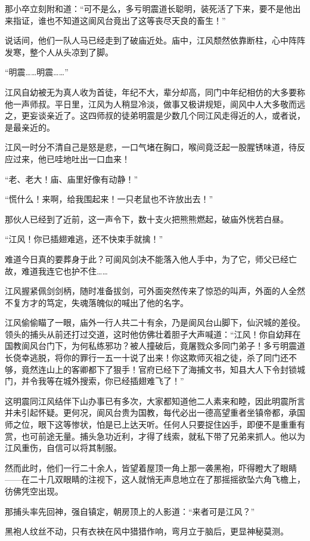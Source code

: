 那小卒立刻附和道：“可不是么，多亏明震道长聪明，装死活了下来，要不是他出来指证，谁也不知道这阆风台竟出了这等丧尽天良的畜生！”

说话间，他们一队人马已经走到了破庙近处。庙中，江风颓然依靠断柱，心中阵阵发寒，整个人从头凉到了脚。

“明震……明震……”

江风自幼被无为真人收为首徒，年纪不大，辈分却高，同门中年纪相仿的大多要称他一声师叔。平日里，江风为人稍显冷淡，做事又极讲规矩，阆风中人大多敬而远之，更妄谈亲近了。这四师叔的徒弟明震是少数几个同江风走得近的人，或者说，是最亲近的。

江风一时分不清自己是怒是悲，一口气堵在胸口，喉间竟泛起一股腥锈味道，待反应过来，他已哇地吐出一口血来！

“老、老大！庙、庙里好像有动静！”

“慌什么！来啊，给我围起来！一只老鼠也不许放出去！”

那伙人已经到了近前，这一声令下，数十支火把熊熊燃起，破庙外恍若白昼。

“江风！你已插翅难逃，还不快束手就擒！”

难道今日真的要葬身于此？可阆风剑决不能落入他人手中，为了它，师父已经亡故，难道我连它也护不住……

江风握紧佩剑剑柄，随时准备拔剑，可外面突然传来了惊恐的叫声，外面的人全然不复方才的笃定，失魂落魄似的喊出了他的名字。

江风偷偷瞄了一眼，庙外一行人共二十有余，乃是阆风台山脚下，仙沢城的差役。领头的捕头从前还打过交道，这时他仿佛壮着胆子大声喊道：“江风！你自幼拜在国教阆风台门下，为何私练邪功？被人撞破后，竟屠戮众多同门弟子！多亏明震道长侥幸逃脱，将你的罪行一五一十说了出来！你这欺师灭祖之徒，杀了同门还不够，竟然连山上的客卿都下了狠手！官府已经下了海捕文书，知县大人下令封锁城门，并令我等在城外搜索，你已经插翅难飞了！”

这明震同江风结伴下山办事已有多次，大家都知道他二人素来和睦，因此明震所言并未引起怀疑。更何况，阆风台贵为国教，每代必出一德高望重者坐镇帝都，承国师之位，眼下这等惨状，怕是已上达天听。任何人只要捉住凶手，即便不是重重有赏，也可前途无量。捕头急功近利，才得了线索，就私下带了兄弟来抓人。他以为江风重伤，自信可以将其制服。

然而此时，他们一行二十余人，皆望着屋顶一角上那一袭黑袍，吓得瞪大了眼睛——在二十几双眼睛的注视下，这人就悄无声息地立在了那摇摇欲坠六角飞檐上，彷佛凭空出现。

那捕头率先回神，强自镇定，朝房顶上的人影道：“来者可是江风？”

黑袍人纹丝不动，只有衣袂在风中猎猎作响，弯月立于脑后，更显神秘莫测。

